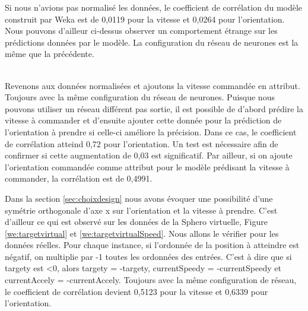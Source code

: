 Si nous n'avions pas normalisé les données, le coefficient de corrélation du modèle construit par Weka est de 0,0119 pour la vitesse et 0,0264 pour l'orientation.
Nous pouvons d'ailleur ci-dessus observer un comportement étrange sur les prédictions données par le modèle.
La configuration du réseau de neurones est la même que la précédente.

\\

Revenons aux données normalisées et ajoutons la vitesse commandée en attribut.
Toujours avec la même configuration du réseau de neurones.
Puisque nous pouvons utiliser un réseau différent pas sortie, il est possible de d'abord prédire la vitesse à commander et d'ensuite ajouter cette donnée pour la prédiction de l'orientation à prendre si celle-ci améliore la précision.
Dans ce cas, le coefficient de corrélation atteind 0,72 pour l'orientation.
Un test est nécessaire afin de confirmer si cette augmentation de 0,03 est significatif.
Par ailleur, si on ajoute l'orientation commandée comme attribut pour le modèle prédisant la vitesse à commander, la corrélation est de 0,4991.

Dans la section \ref{sec:choixdesign} nous avons évoquer une possibilité d'une symétrie orthogonale d'axe x sur l'orientation et la vitesse à prendre.
C'est d'ailleur ce qui est observé sur les données de la Sphero virtuelle, Figure \ref{we:targetvirtual} et \ref{we:targetvirtualSpeed}.
Nous allons le vérifier pour les données réelles.
Pour chaque instance, si l'ordonnée de la position à atteindre est négatif, on multiplie par -1 toutes les ordonnées des entrées.
C'est à dire que si targety est <0, alors targety = -targety, currentSpeedy = -currentSpeedy et currentAccely = -currentAccely.
Toujours avec la même configuration de réseau, le coefficient de corrélation devient 0,5123 pour la vitesse et 0,6339 pour l'orientation.

